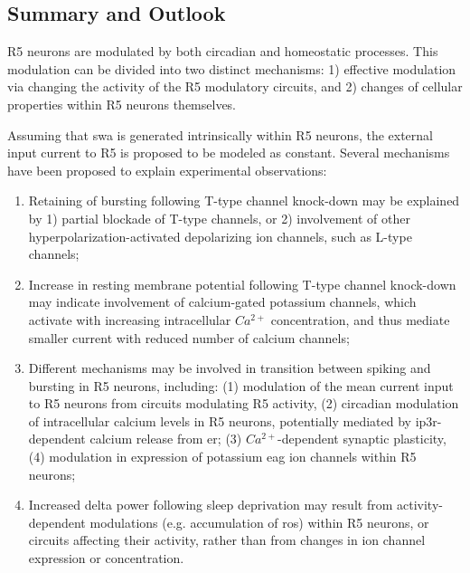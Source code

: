\documentclass[../main.tex]{subfiles}
\begin{document}
\subsection{Summary and Outlook}

R5 neurons are modulated by both circadian and homeostatic processes. This modulation can be divided into two distinct mechanisms: 1) effective modulation via changing the activity of the R5 modulatory circuits, and 2) changes of cellular properties within R5 neurons themselves.

Assuming that \gls{swa} is generated intrinsically within R5 neurons, the external input current to R5 is proposed to be modeled as constant.
Several mechanisms have been proposed to explain experimental observations:
\begin{enumerate}
    \item Retaining of bursting following T-type channel knock-down may be explained by 1) partial blockade of T-type channels, or 2) involvement of other hyperpolarization-activated depolarizing ion channels, such as L-type channels;
    
    \item Increase in resting membrane potential following T-type channel knock-down may indicate involvement of calcium-gated potassium channels, which activate with increasing intracellular $Ca^{2+}$ concentration, and thus mediate smaller current with reduced number of calcium channels;
    
    \item Different mechanisms may be involved in transition between spiking and bursting in R5 neurons, including: (1) modulation of the mean current input to R5 neurons from circuits modulating R5 activity, (2) circadian modulation of intracellular calcium levels in R5 neurons, potentially mediated by \gls{ip3r}-dependent calcium release from \gls{er}; (3) $Ca^{2+}$-dependent synaptic plasticity, (4) modulation in expression of potassium \gls{eag} ion channels within R5 neurons;
    
    \item Increased delta power following sleep deprivation may result from activity-dependent modulations (e.g. accumulation of \gls{ros}) within R5 neurons, or circuits affecting their activity, rather than from changes in ion channel expression or concentration.
    
    
\end{enumerate}
\end{document}
